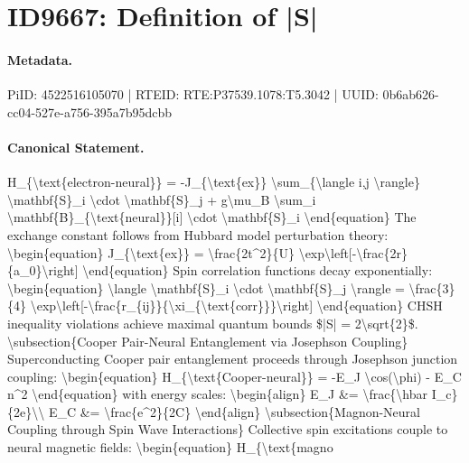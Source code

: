 \section*{ID9667: Definition of |S|}
\paragraph{Metadata.}
PiID: 4522516105070 | RTEID: RTE:P37539.1078:T5.3042 | UUID: 0b6ab626-cc04-527e-a756-395a7b95dcbb

\paragraph{Canonical Statement.}
H\_\{\textbackslash{}text\{electron-neural\}\} = -J\_\{\textbackslash{}text\{ex\}\} \textbackslash{}sum\_\{\textbackslash{}langle i,j \textbackslash{}rangle\} \textbackslash{}mathbf\{S\}\_i \textbackslash{}cdot \textbackslash{}mathbf\{S\}\_j + g\textbackslash{}mu\_B \textbackslash{}sum\_i \textbackslash{}mathbf\{B\}\_\{\textbackslash{}text\{neural\}\}[i] \textbackslash{}cdot \textbackslash{}mathbf\{S\}\_i \textbackslash{}end\{equation\} The exchange constant follows from Hubbard model perturbation theory: \textbackslash{}begin\{equation\} J\_\{\textbackslash{}text\{ex\}\} = \textbackslash{}frac\{2t\textasciicircum{}2\}\{U\} \textbackslash{}exp\textbackslash{}left[-\textbackslash{}frac\{2r\}\{a\_0\}\textbackslash{}right] \textbackslash{}end\{equation\} Spin correlation functions decay exponentially: \textbackslash{}begin\{equation\} \textbackslash{}langle \textbackslash{}mathbf\{S\}\_i \textbackslash{}cdot \textbackslash{}mathbf\{S\}\_j \textbackslash{}rangle = \textbackslash{}frac\{3\}\{4\} \textbackslash{}exp\textbackslash{}left[-\textbackslash{}frac\{r\_\{ij\}\}\{\textbackslash{}xi\_\{\textbackslash{}text\{corr\}\}\}\textbackslash{}right] \textbackslash{}end\{equation\} CHSH inequality violations achieve maximal quantum bounds \$|S| = 2\textbackslash{}sqrt\{2\}\$. \textbackslash{}subsection\{Cooper Pair-Neural Entanglement via Josephson Coupling\} Superconducting Cooper pair entanglement proceeds through Josephson junction coupling: \textbackslash{}begin\{equation\} H\_\{\textbackslash{}text\{Cooper-neural\}\} = -E\_J \textbackslash{}cos(\textbackslash{}phi) - E\_C n\textasciicircum{}2 \textbackslash{}end\{equation\} with energy scales: \textbackslash{}begin\{align\} E\_J \&= \textbackslash{}frac\{\textbackslash{}hbar I\_c\}\{2e\}\textbackslash{}\textbackslash{} E\_C \&= \textbackslash{}frac\{e\textasciicircum{}2\}\{2C\} \textbackslash{}end\{align\} \textbackslash{}subsection\{Magnon-Neural Coupling through Spin Wave Interactions\} Collective spin excitations couple to neural magnetic fields: \textbackslash{}begin\{equation\} H\_\{\textbackslash{}text\{magno

